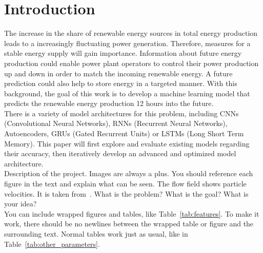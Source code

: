 \documentclass[11pt,table]{article}
\begin{document}
\newpage

\tableofcontents

\newpage


\section{Introduction}

The increase in the share of renewable energy sources in total energy production leads to a increasingly fluctuating power generation. Therefore, measures for a stable energy supply will gain importance. Information about future energy production could enable power plant operators to control their power production up and down in order to match the incoming renewable energy. A future prediction could also help to store energy in a targeted manner. 
With this background, the goal of this work is to develop a machine learning model that predicts the renewable energy production 12 hours into the future.\\
There is a variety of model architectures for this problem, including CNNs (Convolutional Neural Networks), RNNs (Recurrent Neural Networks), Autoencoders, GRUs (Gated Recurrent Units) or LSTMs (Long Short Term Memory). This paper will first explore and evaluate existing models regarding their accuracy, then iteratively develop an advanced and optimized model architecture.\\

Description of the project. Images are always a plus. You should reference each figure in the text and explain what can be seen. The flow field shows particle velocities. It is taken from~\cite{Author2020}. What is the problem? What is the goal? What is your idea?\\ 


You can include wrapped figures and tables, like Table~\ref{tab:features}. To make it work, there should be no newlines between the wrapped table or figure and the surrounding text. Normal tables work just as usual, like in Table~\ref{tab:other_parameters}.\\
\end{document}
